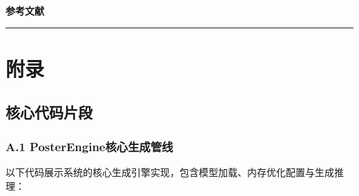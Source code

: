 \documentclass[12pt,a4paper]{ctexart}
\begin{document}
\newpage
\thispagestyle{empty}
\vspace*{2cm}
\begin{center}
{\color{primary}\LARGE\bfseries 参考文献}\\[14pt]
\color{secondary}\rule{0.35\textwidth}{0.6pt}
\end{center}
\vspace{1.2cm}

\printbibliography[heading=none]

\newpage
\appendix
\section{附录}

\subsection{核心代码片段}

\subsubsection*{A.1 PosterEngine核心生成管线}

以下代码展示系统的核心生成引擎实现，包含模型加载、内存优化配置与生成推理：
\end{document}

